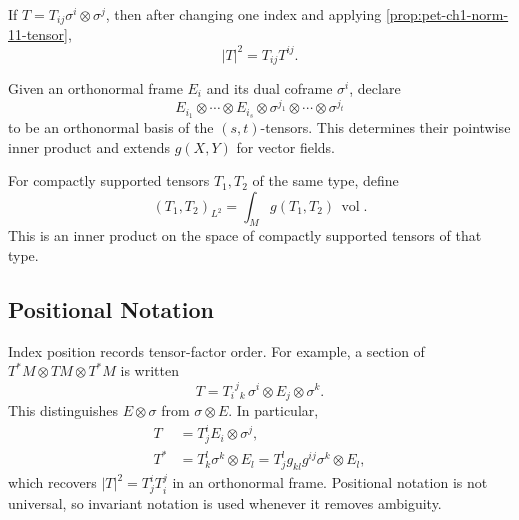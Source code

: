 \begin{proposition}
  \label{prop:pet-ch1-norm-02-tensor}
  \leanok
  If $T=T_{ij}\sigma^i\otimes\sigma^j$, then after changing one index and
  applying \cref{prop:pet-ch1-norm-11-tensor},
  \[
    |T|^2=T_{ij}T^{ij}.
  \]
\end{proposition}

\begin{definition}
  \label{def:pet-ch1-pointwise-tensor-inner}
  \leanok
  Given an orthonormal frame $E_i$ and its dual coframe $\sigma^i$, declare
  \[
    E_{i_1}\otimes\cdots\otimes E_{i_s}\otimes
    \sigma^{j_1}\otimes\cdots\otimes\sigma^{j_t}
  \]
  to be an orthonormal basis of the $(s,t)$-tensors. This determines their
  pointwise inner product and extends $g(X,Y)$ for vector fields.
\end{definition}

\begin{definition}
  \label{def:pet-ch1-l2-tensor-inner}
  \leanok
  For compactly supported tensors $T_1,T_2$ of the same type, define
  \[
    (T_1,T_2)_{L^2}=\int_M g(T_1,T_2)\,\operatorname{vol}.
  \]
  This is an inner product on the space of compactly supported tensors of that
  type.
\end{definition}

\subsection{Positional Notation}

\begin{remark}
  \label{rem:pet-ch1-positional-notation}
  \leanok
  Index position records tensor-factor order. For example, a section of
  $T^*M\otimes TM\otimes T^*M$ is written
  \[
    T={T_i}^j{}_k\,\sigma^i\otimes E_j\otimes\sigma^k.
  \]
  This distinguishes $E\otimes\sigma$ from $\sigma\otimes E$. In particular,
  \[
  \begin{aligned}
    T&=T^i_jE_i\otimes\sigma^j,\\
    T^*&=T^l_k\sigma^k\otimes E_l
       =T^l_jg_{kl}g^{ij}\sigma^k\otimes E_l,
  \end{aligned}
  \]
  which recovers $|T|^2=T^i_jT^j_i$ in an orthonormal frame. Positional
  notation is not universal, so invariant notation is used whenever it
  removes ambiguity.
\end{remark}


